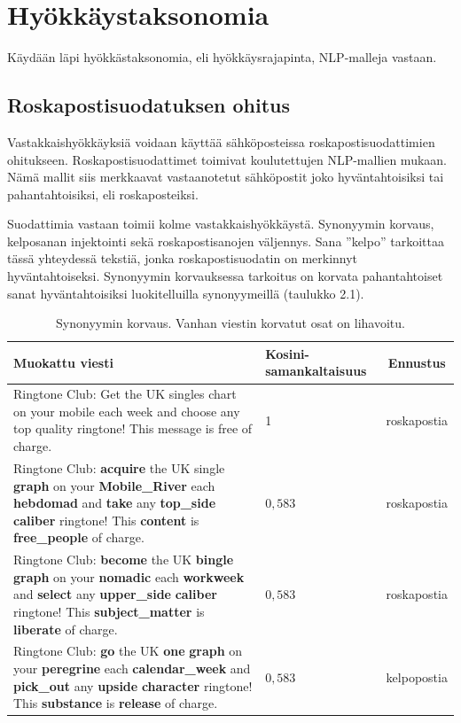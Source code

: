 \chapter{Hyökkäystaksonomia\label{methods}}
Käydään läpi hyökkästaksonomia, eli hyökkäysrajapinta, NLP-malleja vastaan.

\section{Roskapostisuodatuksen ohitus}
Vastakkaishyökkäyksiä voidaan käyttää sähköposteissa roskapostisuodattimien ohitukseen. Roskapostisuodattimet toimivat koulutettujen NLP-mallien mukaan. Nämä mallit siis merkkaavat vastaanotetut sähköpostit joko hyväntahtoisiksi tai pahantahtoisiksi, eli roskaposteiksi. \citep{spamfilter}

Suodattimia vastaan toimii kolme vastakkaishyökkäystä. Synonyymin korvaus, kelposanan injektointi sekä roskapostisanojen väljennys. Sana ''kelpo'' tarkoittaa tässä yhteydessä tekstiä, jonka roskapostisuodatin on merkinnyt hyväntahtoiseksi. Synonyymin korvauksessa tarkoitus on korvata pahantahtoiset sanat hyväntahtoisiksi luokitelluilla synonyymeillä (taulukko 2.1).

\begin{table}[t]
  \begin{tabular}{| m{22em} | m{5em} | c |}
    \hline
    Muokattu viesti & Kosini-saman\-kaltaisuus & Ennustus \\
    \hline
    Ringtone Club: Get the UK singles chart on your mobile each week and choose any top quality ringtone! This message is free of charge. & 1 & roskapostia \\
    \hline
    Ringtone Club: \textbf{acquire} the UK single \textbf{graph} on your \textbf{Mobile\_River} each \textbf{hebdomad} and \textbf{take} any \textbf{top\_side} \textbf{caliber} ringtone! This \textbf{content} is \textbf{free\_people} of charge. & $0,583$ & roskapostia \\
    \hline
    Ringtone Club: \textbf{become} the UK \textbf{bingle} \textbf{graph} on your \textbf{nomadic} each \textbf{workweek} and \textbf{select} any \textbf{upper\_side} \textbf{caliber} ringtone! This \textbf{subject\_matter} is \textbf{liberate} of charge. & $0,583$ & roskapostia \\
    \hline
    Ringtone Club: \textbf{go} the UK \textbf{one} \textbf{graph} on your \textbf{peregrine} each \textbf{calendar\_week} and \textbf{pick\_out} any \textbf{upside} \textbf{character} ringtone! This \textbf{substance} is \textbf{release} of charge. & $0,583$ & kelpopostia \\
    \hline
  \end{tabular}
  \caption{Synonyymin korvaus. Vanhan viestin korvatut osat on lihavoitu. \citep{spamfilter}}
\end{table}

